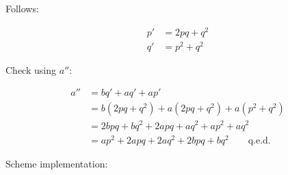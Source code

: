 \documentclass[a4paper]{scrartcl}
\begin{document}
Follows:

\begin{align}
p' & = 2pq + q^2 \\
q' & = p^2 + q^2
\end{align}

Check using $a''$:

\begin{align}
a'' & = bq' + aq' + ap' \\
& = b(2pq+q^2) + a(2pq+q^2) + a(p^2+q^2) \\
& = 2bpq + bq^2 + 2apq + aq^2 + ap^2 + aq^2 \\
& = ap^2 + 2apq + 2aq^2 + 2bpq + bq^2 \qquad \text{q.e.d.}
\end{align}

Scheme implementation:


\end{document}
